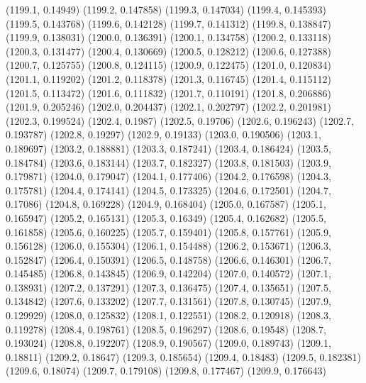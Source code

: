 {					(1199.1, 0.14949)
					(1199.2, 0.147858)
					(1199.3, 0.147034)
					(1199.4, 0.145393)
					(1199.5, 0.143768)
					(1199.6, 0.142128)
					(1199.7, 0.141312)
					(1199.8, 0.138847)
					(1199.9, 0.138031)
					(1200.0, 0.136391)
					(1200.1, 0.134758)
					(1200.2, 0.133118)
					(1200.3, 0.131477)
					(1200.4, 0.130669)
					(1200.5, 0.128212)
					(1200.6, 0.127388)
					(1200.7, 0.125755)
					(1200.8, 0.124115)
					(1200.9, 0.122475)
					(1201.0, 0.120834)
					(1201.1, 0.119202)
					(1201.2, 0.118378)
					(1201.3, 0.116745)
					(1201.4, 0.115112)
					(1201.5, 0.113472)
					(1201.6, 0.111832)
					(1201.7, 0.110191)
					(1201.8, 0.206886)
					(1201.9, 0.205246)
					(1202.0, 0.204437)
					(1202.1, 0.202797)
					(1202.2, 0.201981)
					(1202.3, 0.199524)
					(1202.4, 0.1987)
					(1202.5, 0.19706)
					(1202.6, 0.196243)
					(1202.7, 0.193787)
					(1202.8, 0.19297)
					(1202.9, 0.19133)
					(1203.0, 0.190506)
					(1203.1, 0.189697)
					(1203.2, 0.188881)
					(1203.3, 0.187241)
					(1203.4, 0.186424)
					(1203.5, 0.184784)
					(1203.6, 0.183144)
					(1203.7, 0.182327)
					(1203.8, 0.181503)
					(1203.9, 0.179871)
					(1204.0, 0.179047)
					(1204.1, 0.177406)
					(1204.2, 0.176598)
					(1204.3, 0.175781)
					(1204.4, 0.174141)
					(1204.5, 0.173325)
					(1204.6, 0.172501)
					(1204.7, 0.17086)
					(1204.8, 0.169228)
					(1204.9, 0.168404)
					(1205.0, 0.167587)
					(1205.1, 0.165947)
					(1205.2, 0.165131)
					(1205.3, 0.16349)
					(1205.4, 0.162682)
					(1205.5, 0.161858)
					(1205.6, 0.160225)
					(1205.7, 0.159401)
					(1205.8, 0.157761)
					(1205.9, 0.156128)
					(1206.0, 0.155304)
					(1206.1, 0.154488)
					(1206.2, 0.153671)
					(1206.3, 0.152847)
					(1206.4, 0.150391)
					(1206.5, 0.148758)
					(1206.6, 0.146301)
					(1206.7, 0.145485)
					(1206.8, 0.143845)
					(1206.9, 0.142204)
					(1207.0, 0.140572)
					(1207.1, 0.138931)
					(1207.2, 0.137291)
					(1207.3, 0.136475)
					(1207.4, 0.135651)
					(1207.5, 0.134842)
					(1207.6, 0.133202)
					(1207.7, 0.131561)
					(1207.8, 0.130745)
					(1207.9, 0.129929)
					(1208.0, 0.125832)
					(1208.1, 0.122551)
					(1208.2, 0.120918)
					(1208.3, 0.119278)
					(1208.4, 0.198761)
					(1208.5, 0.196297)
					(1208.6, 0.19548)
					(1208.7, 0.193024)
					(1208.8, 0.192207)
					(1208.9, 0.190567)
					(1209.0, 0.189743)
					(1209.1, 0.18811)
					(1209.2, 0.18647)
					(1209.3, 0.185654)
					(1209.4, 0.18483)
					(1209.5, 0.182381)
					(1209.6, 0.18074)
					(1209.7, 0.179108)
					(1209.8, 0.177467)
					(1209.9, 0.176643)
}
